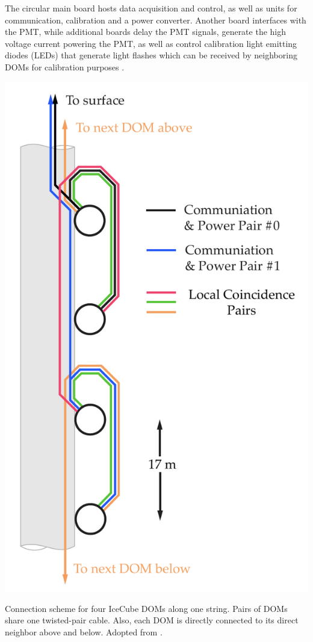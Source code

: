 \documentclass[
    a4paper, %
    fontsize=10pt, %
    twoside=true, %
    numbers=noenddot, %
    fontmethod=tex, %
]{kaobook}
\begin{document}
The circular main board hosts data acquisition and control, as well as units for communication, calibration and a power converter. Another board interfaces with the PMT, while additional boards delay the PMT signals, generate the high voltage current powering the PMT, as well as control calibration light emitting diodes (LEDs) that generate light flashes which can be received by neighboring DOMs for calibration purposes .
\begin{marginfigure}
    \includegraphics{ic_DOM_connections.pdf}
    \caption[IceCube DOM connections]{Connection scheme for four IceCube DOMs along one string. Pairs of DOMs share one twisted-pair cable. Also, each DOM is directly connected to its direct neighbor above and below. Adopted from \cite{Aartsen2017}.} 
\end{marginfigure}
\end{document}
